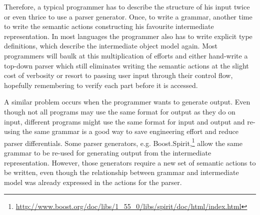 Therefore, a typical programmer has to describe the structure of his input
twice or even thrice to use a parser generator. Once, to write a grammar,
another time to write the semantic actions constructing his favourite
intermediate representation. In most languages the programmer also
has to write explicit type definitions, which describe the intermediate
object model again. Most programmers will baulk at this multiplication of
efforts and either hand-write a top-down parser which still eliminates
writing the semantic actions at the slight cost of verbosity or resort
to passing user input through their control flow, hopefully remembering
to verify each part before it is accessed.

A similar problem occurs when the programmer wants to generate output.
Even though not all programs may use the same format for output as they
do on input, different programs might use the same format for input and
output and re-using the same grammar is a good way to save engineering
effort and reduce parser differentials.  Some parser generators, e.g.
Boost.Spirit,\footnote{\url{http://www.boost.org/doc/libs/1_55_0/libs/spirit/doc/html/index.html}}
allow the same grammar to be re-used for generating output from the
intermediate representation.  However, those generators require a new set
of semantic actions to be written, even though the relationship between
grammar and intermediate model was already expressed in the actions for
the parser.

